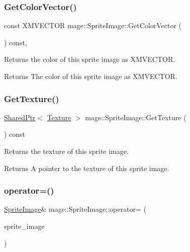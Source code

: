 \subsubsection{\texorpdfstring{Get\+Color\+Vector()}{GetColorVector()}}
{\footnotesize\ttfamily const X\+M\+V\+E\+C\+T\+OR mage\+::\+Sprite\+Image\+::\+Get\+Color\+Vector (\begin{DoxyParamCaption}{ }\end{DoxyParamCaption}) const\hspace{0.3cm}{\ttfamily [private]}, {\ttfamily [noexcept]}}

Returns the color of this sprite image as {\ttfamily X\+M\+V\+E\+C\+T\+OR}.

\begin{DoxyReturn}{Returns}
The color of this sprite image as {\ttfamily X\+M\+V\+E\+C\+T\+OR}. 
\end{DoxyReturn}
\hypertarget{classmage_1_1_sprite_image_af0702a186685d80bab77c23643be1674}{}\label{classmage_1_1_sprite_image_af0702a186685d80bab77c23643be1674} 
\subsubsection{\texorpdfstring{Get\+Texture()}{GetTexture()}}
{\footnotesize\ttfamily \hyperlink{namespacemage_a1e01ae66713838a7a67d30e44c67703e}{Shared\+Ptr}$<$ \hyperlink{classmage_1_1_texture}{Texture} $>$ mage\+::\+Sprite\+Image\+::\+Get\+Texture (\begin{DoxyParamCaption}{ }\end{DoxyParamCaption}) const\hspace{0.3cm}{\ttfamily [noexcept]}}

Returns the texture of this sprite image.

\begin{DoxyReturn}{Returns}
A pointer to the texture of this sprite image. 
\end{DoxyReturn}
\hypertarget{classmage_1_1_sprite_image_a20d8e8272cf62599f6c0e4b1ff4f3586}{}\label{classmage_1_1_sprite_image_a20d8e8272cf62599f6c0e4b1ff4f3586} 
\subsubsection{\texorpdfstring{operator=()}{operator=()}\hspace{0.1cm}{\footnotesize\ttfamily [1/2]}}
{\footnotesize\ttfamily \hyperlink{classmage_1_1_sprite_image}{Sprite\+Image}\& mage\+::\+Sprite\+Image\+::operator= (\begin{DoxyParamCaption}\item[{const \hyperlink{classmage_1_1_sprite_image}{Sprite\+Image} \&}]{sprite\+\_\+image }\end{DoxyParamCaption})\hspace{0.3cm}{\ttfamily [delete]}}

